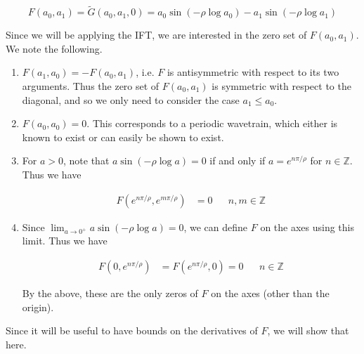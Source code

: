 \documentclass[12pt]{article}
\def\Z{{\mathbb Z}}
\begin{document}
\begin{equation}\label{defF}
F(a_0, a_1) = \tilde{G}(a_0, a_1, 0) = 
a_0 \sin \left( -\rho \log a_0 \right) - a_1 \sin \left( -\rho \log a_1 \right)
\end{equation}

Since we will be applying the IFT, we are interested in the zero set of $F(a_0, a_1)$. We note the following.

\begin{enumerate}
	\item $F(a_1, a_0) = -F(a_0, a_1)$, i.e. $F$ is antisymmetric with respect to its two arguments. Thus the zero set of $F(a_0, a_1)$ is symmetric with respect to the diagonal, and so we only need to consider the case $a_1 \leq a_0$.

	\item $F(a_0, a_0) = 0$. This corresponds to a periodic wavetrain, which either is known to exist or can easily be shown to exist.

	\item For $a > 0$, note that $a \sin \left( -\rho \log a \right) = 0$ if and only if $a = e^{n \pi / \rho}$ for $n \in \Z$. Thus we have

	\begin{align*}
	F(e^{n \pi / \rho}, e^{m \pi / \rho}) &= 0 && n, m \in \Z
	\end{align*}

    \item Since $\lim_{a \rightarrow 0^+} a \sin \left( -\rho \log a \right) = 0$, we can define $F$ on the axes using this limit. Thus we have

    \begin{align*}
	F(0, e^{n \pi / \rho}) &= F(e^{n \pi / \rho}, 0) = 0 && n \in \Z
	\end{align*}

	By the above, these are the only zeros of $F$ on the axes (other than the origin).
\end{enumerate}

Since it will be useful to have bounds on the derivatives of $F$, we will show that here.

\end{document}
